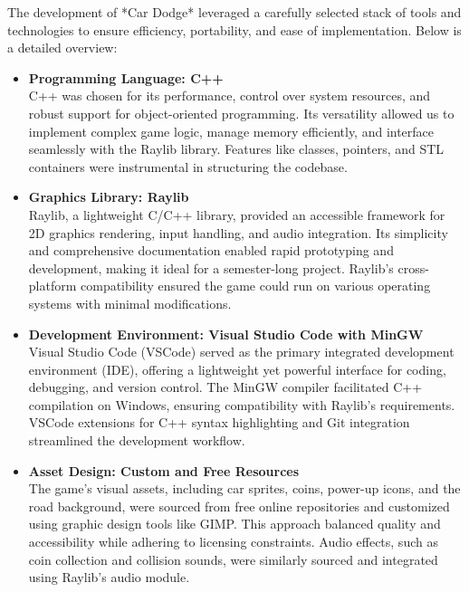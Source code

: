 \documentclass[12pt,a4paper]{article}
\begin{document}
The development of *Car Dodge* leveraged a carefully selected stack of tools and technologies to ensure efficiency, portability, and ease of implementation. Below is a detailed overview: \\

\begin{itemize}
    \item \textbf{Programming Language: C++} \\
    C++ was chosen for its performance, control over system resources, and robust support for object-oriented programming. Its versatility allowed us to implement complex game logic, manage memory efficiently, and interface seamlessly with the Raylib library. Features like classes, pointers, and STL containers were instrumental in structuring the codebase. \\
    
    \item \textbf{Graphics Library: Raylib} \\
    Raylib, a lightweight C/C++ library, provided an accessible framework for 2D graphics rendering, input handling, and audio integration. Its simplicity and comprehensive documentation enabled rapid prototyping and development, making it ideal for a semester-long project. Raylib’s cross-platform compatibility ensured the game could run on various operating systems with minimal modifications. \\
    
    \item \textbf{Development Environment: Visual Studio Code with MinGW} \\
    Visual Studio Code (VSCode) served as the primary integrated development environment (IDE), offering a lightweight yet powerful interface for coding, debugging, and version control. The MinGW compiler facilitated C++ compilation on Windows, ensuring compatibility with Raylib’s requirements. VSCode extensions for C++ syntax highlighting and Git integration streamlined the development workflow. \\
    
    \item \textbf{Asset Design: Custom and Free Resources} \\
    The game’s visual assets, including car sprites, coins, power-up icons, and the road background, were sourced from free online repositories and customized using graphic design tools like GIMP. This approach balanced quality and accessibility while adhering to licensing constraints. Audio effects, such as coin collection and collision sounds, were similarly sourced and integrated using Raylib’s audio module. \\
    

\end{itemize}
\end{document}
